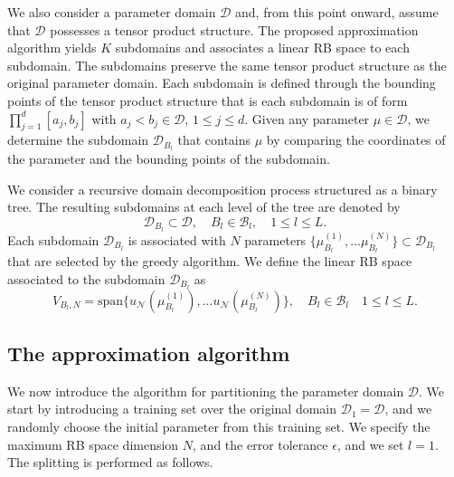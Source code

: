 \documentclass[12pt]{article}
\theoremstyle{remark}
\theoremstyle{definition}
\numberwithin{equation}{section}
\begin{document}
We also consider a parameter domain $\mathcal{D}$ and, from this point onward, assume that $\mathcal{D}$ possesses a tensor product structure. The proposed approximation algorithm yields $K$ subdomains and associates a linear RB space to each subdomain. The subdomains preserve the same tensor product structure as the original parameter domain. Each subdomain is defined through the bounding points of the tensor product structure that is each subdomain is of form $\prod_{j=1}^d[a_j,b_j]$ with $a_j<b_j\in \mathcal{D}$, $1\leq j \leq d$. Given any parameter $\mu \in \mathcal{D}$, we determine the subdomain $\mathcal{D}_{B_l}$ that contains $\mu$ by comparing the coordinates of the parameter and the bounding points of the subdomain.

We consider a recursive domain decomposition process structured as a binary tree. The resulting subdomains at each level of the tree are denoted by
\begin{equation}
    \mathcal{D}_{B_l} \subset \mathcal{D}, \quad B_l \in \mathcal{B}_l, \quad 1 \leq l \leq L.
\end{equation}
Each subdomain $\mathcal{D}_{B_l}$  is associated with $N$ parameters $\{\mu^{(1)}_{B_l},...\mu^{(N)}_{B_l}\} \subset \mathcal{D}_{B_l}$ that are selected by the greedy algorithm. We define the linear RB space associated to the subdomain $\mathcal{D}_{B_l}$ as 
\begin{equation}
    V_{B_l,N}=\text{span} \{u_{\mathcal{N}}(\mu^{(1)}_{B_l}),...u_{\mathcal{N}}(\mu^{(N)}_{B_l})\}, \quad B_l \in  \mathcal{B}_l \quad 1 \leq l \leq L .
\end{equation}

\subsection{The approximation algorithm}
We now introduce the algorithm for partitioning the parameter domain $\mathcal{D}$. We start by introducing a training set over the original domain $\mathcal{D}_{1}=\mathcal{D}$, and we randomly choose the initial parameter from this training set. We specify the maximum RB space dimension $N$, and the error tolerance $\epsilon$, and we set $l=1$. The splitting is performed as follows.
\end{document}
